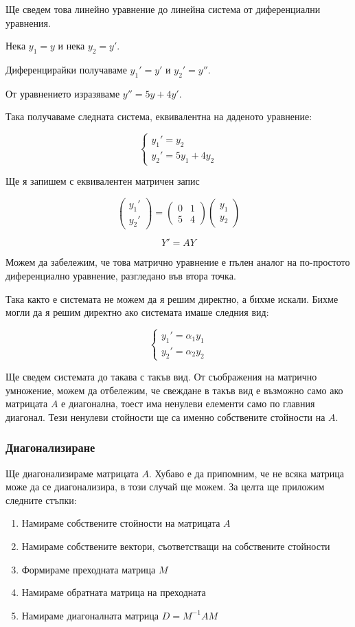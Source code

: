 \documentclass{scrartcl}
\begin{document}
Ще сведем това линейно уравнение до линейна система от диференциални уравнения.

Нека $y_1 = y$ и нека $y_2 = y'$.

Диференцирайки получаваме $y_1' = y'$ и $y_2' = y''$.

От уравнението изразяваме $y'' = 5y + 4y'$.

Така получаваме следната система, еквивалентна на даденото уравнение:

$$
\begin{cases}
y_1' = y_2\\
y_2' = 5y_1 + 4y_2
\end{cases}
$$

Ще я запишем с еквивалентен матричен запис

$$
\begin{pmatrix}
y_1'\\ y_2'
\end{pmatrix}
=
\begin{pmatrix}
0 & 1\\ 5 & 4
\end{pmatrix}
\begin{pmatrix}
y_1\\ y_2
\end{pmatrix}
$$

$$Y' = AY$$

Можем да забележим, че това матрично уравнение е пълен аналог на по-простото диференциално уравнение, разгледано във втора точка.

Така както е системата не можем да я решим директно, а бихме искали. Бихме могли да я решим директно ако системата имаше следния вид:

$$
\begin{cases}
y_1' = \alpha_{1}y_1\\
y_2' = \alpha_{2}y_2
\end{cases}
$$

Ще сведем системата до такава с такъв вид. От съображения на матрично умножение, можем да отбележим, че свеждане в такъв вид е възможно само ако матрицата $A$ е диагонална, тоест има ненулеви елементи само по главния диагонал. Тези ненулеви стойности ще са именно собствените стойности на $A$.

\subsubsection{Диагонализиране}

Ще диагонализираме матрицата $A$. Хубаво е да припомним, че не всяка матрица може да се диагонализира, в този случай ще можем. За целта ще приложим следните стъпки:
\begin{enumerate}
    \item Намираме собствените стойности на матрицата $A$
    \item Намираме собствените вектори, съответстващи на собствените стойности
    \item Формираме преходната матрица $M$
    \item Намираме обратната матрица на преходната
    \item Намираме диагоналната матрица $D = M^{-1}AM$
\end{enumerate}
\end{document}
